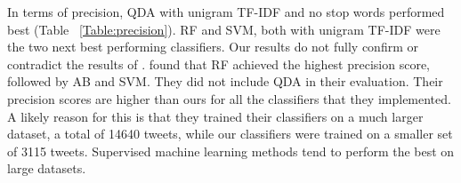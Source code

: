 In terms of precision, QDA with unigram TF-IDF and no stop words performed best (Table ~\ref{Table:precision}). RF and SVM, both with unigram TF-IDF  were the two next best performing classifiers. Our results do not fully confirm or contradict the results of \cite{Rane2018}. \cite{Rane2018} found that RF achieved the highest precision score, followed by AB and SVM. They did not include QDA in their evaluation. Their precision scores are higher than ours for all the classifiers that they implemented. A likely reason for this is that they trained their classifiers on a much larger dataset, a total of 14640 tweets, while our classifiers were trained on a smaller set of 3115 tweets. Supervised machine learning methods tend to perform the best on large datasets.

\begin{table}[h!]
\setlength{\tabcolsep}{3pt}
\caption{Recall of Classifiers for different Feature Representations.}
\label{Table:recall}
\end{table}
